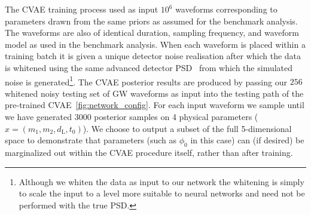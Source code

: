 \documentclass[%
showpacs,
 amsmath,amssymb,
 aps,
 twocolumn,
 prl,
 reprint,
floatfix,
]{revtex4-1}
\begin{document}
%
%
The \ac{CVAE} training process used as input $10^{6}$ waveforms corresponding
to parameters drawn from the same priors as assumed for the benchmark analysis.
The waveforms are also of identical duration, sampling frequency, and waveform
model as used in the benchmark analysis. When each waveform is placed within a
training batch it is given a unique detector noise realisation after which the
data is whitened using the same advanced detector
\ac{PSD}~\cite{2016LRR....19....1A} from which the simulated noise is
generated\footnote{Although we whiten the data as input to our network the
whitening is simply to scale the input to a level more suitable to neural
networks and need not be performed with the true \ac{PSD}.}. The \ac{CVAE}
posterior results are produced by passing our $256$ whitened noisy testing set
of \ac{GW} waveforms as input into the testing path of the pre-trained
\ac{CVAE}~\ref{fig:network_config}. For each input waveform we sample until we
have generated $3000$ posterior samples on 4 physical parameters
($x=(m_1,m_2,d_{\text{L}},t_{0})$). We choose to output a subset of the full
5-dimensional space to demonstrate that parameters (such as $\phi_0$ in this
case) can (if desired) be marginalized out within the \ac{CVAE} procedure
itself, rather than after training. 
\end{document}
